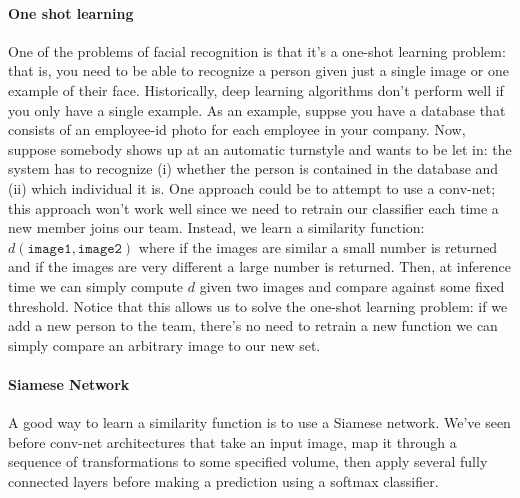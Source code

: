 \documentclass[12pt]{article}
\begin{document}
\paragraph{One shot learning} One of the problems of facial recognition is that it's a one-shot learning problem: that is, you need to be able to recognize a person given just a single image or one example of their face. Historically, deep learning algorithms don't perform well if you only have a single example.
As an example, suppse you have a database that consists of an employee-id photo for each employee in your company. Now, suppose somebody shows up at an automatic turnstyle and wants to be let in: the system has to recognize (i)
whether the person is contained in the database and (ii) which individual it is. One approach could be to attempt to use a conv-net; this approach won't work well since we need to retrain our classifier each time a new member joins our team. Instead, we learn a similarity function: $d(\texttt{image1}, \texttt{image2})$ where if the images are similar a small number is returned and if the images are very different a large number is returned. Then, at inference time we can simply compute $d$ given two images and compare against some fixed threshold. Notice that this allows us to solve the one-shot learning problem: if we add a new person to the team, there's no need to retrain a new function we can simply compare an arbitrary image to our new set.

\paragraph{Siamese Network} A good way to learn a similarity function is to use a Siamese network. We've seen before conv-net architectures that take an input image, map it through a sequence of transformations to some specified volume, then apply several fully connected layers before making a prediction using a softmax classifier.
\end{document}
